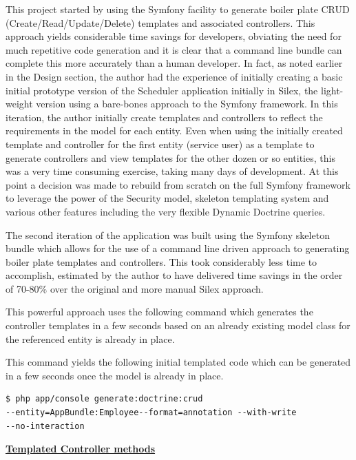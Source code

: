 \documentclass[a4paper,Times New Roman 11pt]{article}
\begin{document}
This project started by using the Symfony facility to generate boiler plate CRUD (Create/Read/Update/Delete) templates and associated controllers. This approach yields considerable time savings for developers, obviating the need for much repetitive code generation and it is clear that a command line bundle can complete this more accurately than a human developer. In fact, as noted earlier in the Design section, the author had the experience of initially creating a basic initial prototype version of the Scheduler application initially in Silex, the light-weight version using a bare-bones approach to the Symfony framework. In this iteration, the author initially create templates and controllers to reflect the requirements in the model for each entity. Even when using the initially created template and controller for the first entity (service user) as a template to generate controllers and view templates for the other dozen or so entities, this was a very time consuming exercise, taking many days of development. At this point a decision was made to rebuild from scratch on the full Symfony framework to leverage the power of the Security model, skeleton templating system and various other features including the very flexible Dynamic Doctrine queries. 

The second iteration of the application was built using the Symfony skeleton bundle which allows for the use of a command line driven approach to 
generating boiler plate templates and controllers. This took considerably less time to accomplish, estimated by the author to have delivered time savings in the order of 70-80\% over the original and more manual Silex approach.

This powerful approach uses the following command which generates the controller templates  in a few seconds based on an already existing model class for the referenced entity is already in place.

This command yields the following initial templated code which can be generated in a few seconds once the model is already in place.

\begin{verbatim}
$ php app/console generate:doctrine:crud 
--entity=AppBundle:Employee--format=annotation --with-write
--no-interaction
\end{verbatim}

\textbf {\underline{Templated Controller methods}}
\end{document}
